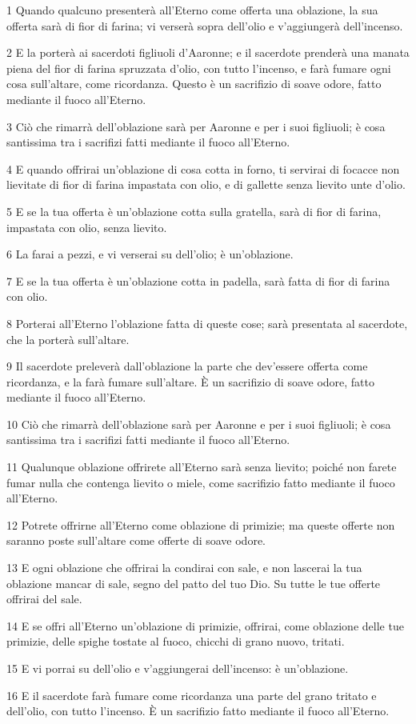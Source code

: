 \par 1 Quando qualcuno presenterà all'Eterno come offerta una oblazione, la sua offerta sarà di fior di farina; vi verserà sopra dell'olio e v'aggiungerà dell'incenso.
\par 2 E la porterà ai sacerdoti figliuoli d'Aaronne; e il sacerdote prenderà una manata piena del fior di farina spruzzata d'olio, con tutto l'incenso, e farà fumare ogni cosa sull'altare, come ricordanza. Questo è un sacrifizio di soave odore, fatto mediante il fuoco all'Eterno.
\par 3 Ciò che rimarrà dell'oblazione sarà per Aaronne e per i suoi figliuoli; è cosa santissima tra i sacrifizi fatti mediante il fuoco all'Eterno.
\par 4 E quando offrirai un'oblazione di cosa cotta in forno, ti servirai di focacce non lievitate di fior di farina impastata con olio, e di gallette senza lievito unte d'olio.
\par 5 E se la tua offerta è un'oblazione cotta sulla gratella, sarà di fior di farina, impastata con olio, senza lievito.
\par 6 La farai a pezzi, e vi verserai su dell'olio; è un'oblazione.
\par 7 E se la tua offerta è un'oblazione cotta in padella, sarà fatta di fior di farina con olio.
\par 8 Porterai all'Eterno l'oblazione fatta di queste cose; sarà presentata al sacerdote, che la porterà sull'altare.
\par 9 Il sacerdote preleverà dall'oblazione la parte che dev'essere offerta come ricordanza, e la farà fumare sull'altare. È un sacrifizio di soave odore, fatto mediante il fuoco all'Eterno.
\par 10 Ciò che rimarrà dell'oblazione sarà per Aaronne e per i suoi figliuoli; è cosa santissima tra i sacrifizi fatti mediante il fuoco all'Eterno.
\par 11 Qualunque oblazione offrirete all'Eterno sarà senza lievito; poiché non farete fumar nulla che contenga lievito o miele, come sacrifizio fatto mediante il fuoco all'Eterno.
\par 12 Potrete offrirne all'Eterno come oblazione di primizie; ma queste offerte non saranno poste sull'altare come offerte di soave odore.
\par 13 E ogni oblazione che offrirai la condirai con sale, e non lascerai la tua oblazione mancar di sale, segno del patto del tuo Dio. Su tutte le tue offerte offrirai del sale.
\par 14 E se offri all'Eterno un'oblazione di primizie, offrirai, come oblazione delle tue primizie, delle spighe tostate al fuoco, chicchi di grano nuovo, tritati.
\par 15 E vi porrai su dell'olio e v'aggiungerai dell'incenso: è un'oblazione.
\par 16 E il sacerdote farà fumare come ricordanza una parte del grano tritato e dell'olio, con tutto l'incenso. È un sacrifizio fatto mediante il fuoco all'Eterno.

